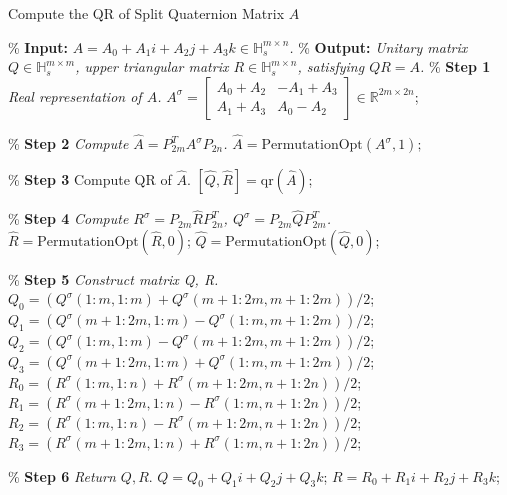 \documentclass[12pt]{article}
\numberwithin{equation}{section}
\begin{document}
\begin{algorithm}[htbp] 
    \caption{Compute the QR of Split Quaternion Matrix \(A\)}
    \label{alg:QR}
    \begin{algorithmic}[1]
        \State \% \textbf{Input:} \textit{\(A = A_0 + A_1 i + A_2 j + A_3 k \in \mathbb{H}_s^{m\times n}\).}
        \State \% \textbf{Output:} \textit{Unitary matrix \(Q \in \mathbb{H}_s^{m\times m}\), upper triangular matrix \(R \in \mathbb{H}_s^{m\times n}\), satisfying \(Q  R = A\).}
        \State
        \State \% \textbf{Step 1} \textit{Real representation of $A$.}
        \State \(A^\sigma = \begin{bmatrix}
            A_0 + A_2 & -A_1 + A_3 \\ 
            A_1 + A_3 & A_0 - A_2
            \end{bmatrix} \in \mathbb{R}^{2m\times 2n}\); 
        
        \State
        \State \% \textbf{Step 2} \textit{Compute \(\widehat{A} = P_{2m}^T A^\sigma P_{2n}\).}
        \State $\widehat{A}=\text{PermutationOpt}(A^\sigma,1);$  
        
        \State
        \State \% \textbf{Step 3} Compute QR of $\widehat{A}$.
        \State \([\widehat{Q},\widehat{R}] = \text{qr}(\widehat{A})\); 
        
        \State
        \State \% \textbf{Step 4} \textit{Compute \(R^\sigma = P_{2m}\widehat{R}P_{2n}^T\), \(Q^\sigma = P_{2m}\widehat{Q}P_{2m}^T\). }
        \State $\widehat{R}=\text{PermutationOpt}(\widehat{R},0)$;
        \State $\widehat{Q}=\text{PermutationOpt}(\widehat{Q},0)$;
        
        \State
        \State \% \textbf{Step 5} \textit{Construct matrix Q, R.}
        \State $Q_0 = (Q^\sigma(1\!:\!m,1\!:\!m) + Q^\sigma(m+1\!:\!2m,m+1\!:\!2m))/2$;
        \State $Q_1 = (Q^\sigma(m+1\!:\!2m,1\!:\!m) - Q^\sigma(1\!:\!m,m+1\!:\!2m))/2$;
        \State $Q_2 = (Q^\sigma(1\!:\!m,1\!:\!m) - Q^\sigma(m+1\!:\!2m,m+1\!:\!2m))/2$;
        \State $Q_3 = (Q^\sigma(m+1\!:\!2m,1\!:\!m) + Q^\sigma(1\!:\!m,m+1\!:\!2m))/2$;
        \State $R_0 = (R^\sigma(1\!:\!m,1\!:\!n) + R^\sigma(m+1\!:\!2m,n+1\!:\!2n))/2$;
        \State $R_1 = (R^\sigma(m+1\!:\!2m,1\!:\!n) - R^\sigma(1\!:\!m,n+1\!:\!2n))/2$;
        \State $R_2 = (R^\sigma(1\!:\!m,1\!:\!n) - R^\sigma(m+1\!:\!2m,n+1\!:\!2n))/2$;
        \State $R_3 = (R^\sigma(m+1\!:\!2m,1\!:\!n) + R^\sigma(1\!:\!m,n+1\!:\!2n))/2$;

        \State
        \State \% \textbf{Step 6} \textit{Return $Q, R$}.
        \State $Q = Q_0 + Q_1i + Q_2j + Q_3k$; 
        \State $R = R_0 + R_1i + R_2j + R_3k$;
    \End 
    \end{algorithmic}
\end{algorithm}
\end{document}
